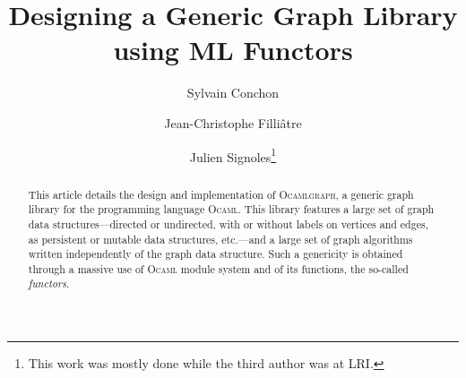 \documentclass[tfpsymp]{tfp05symp}
\newcommand{\ocamlgraph}{\textsc{Ocamlgraph}\xspace}
\newcommand{\ocaml}{\textsc{Ocaml}\xspace}
\begin{document}


\title{Designing a Generic Graph Library \\ using ML Functors}


\author
    {Sylvain Conchon \and 
     Jean-Christophe Filli\^atre \and 
     Julien Signoles\protect\footnote[1]{This work was mostly done
    while the third author was at LRI.}}





\maketitle

\begin{abstract}
  This article details the design and implementation of \ocamlgraph, a
  generic graph library for the programming language \ocaml. This
  library features a large set of graph data structures---directed or
  undirected, with or without labels on vertices and edges, as persistent
  or mutable data structures, etc.---and a large set of graph
  algorithms written independently of the graph data structure. Such a
  genericity is obtained through a massive use of \ocaml module system
  and of its functions, the so-called \emph{functors}.
\end{abstract}



\end{document}
